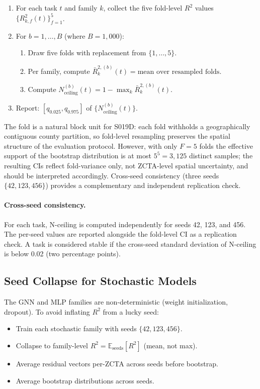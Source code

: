\documentclass{article}
\begin{document}
\begin{enumerate}
\item For each task $t$ and family $k$, collect the five fold-level $R^2$ values $\{R^2_{k,f}(t)\}_{f=1}^{5}$.
\item For $b = 1, \ldots, B$ (where $B{=}1{,}000$):
\begin{enumerate}
\item Draw five folds with replacement from $\{1,\ldots,5\}$.
\item Per family, compute $\bar{R}^{2,(b)}_k(t) = \text{mean over resampled folds}$.
\item Compute $N^{(b)}_{\text{ceiling}}(t) = 1 - \max_k \bar{R}^{2,(b)}_k(t)$.
\end{enumerate}
\item Report: $[q_{0.025}, q_{0.975}]$ of $\{N^{(b)}_{\text{ceiling}}(t)\}$.
\end{enumerate}

The fold is a natural block unit for S019D: each fold withholds a geographically contiguous county partition, so fold-level resampling preserves the spatial structure of the evaluation protocol. However, with only $F{=}5$ folds the effective support of the bootstrap distribution is at most $5^5 = 3{,}125$ distinct samples; the resulting CIs reflect fold-variance only, not ZCTA-level spatial uncertainty, and should be interpreted accordingly. Cross-seed consistency (three seeds $\{42, 123, 456\}$) provides a complementary and independent replication check.

\paragraph{Cross-seed consistency.} For each task, N-ceiling is computed independently for seeds 42, 123, and 456. The per-seed values are reported alongside the fold-level CI as a replication check. A task is considered stable if the cross-seed standard deviation of N-ceiling is below 0.02 (two percentage points).

\subsection{Seed Collapse for Stochastic Models}

The GNN and MLP families are non-deterministic (weight initialization, dropout). To avoid inflating $R^2$ from a lucky seed:
\begin{itemize}
\item Train each stochastic family with seeds $\{42, 123, 456\}$.
\item Collapse to family-level $R^2 = \mathbb{E}_{\text{seeds}}[R^2]$ (mean, not max).
\item Average residual vectors per-ZCTA across seeds before bootstrap.
\item Average bootstrap distributions across seeds.
\end{itemize}
\end{document}
